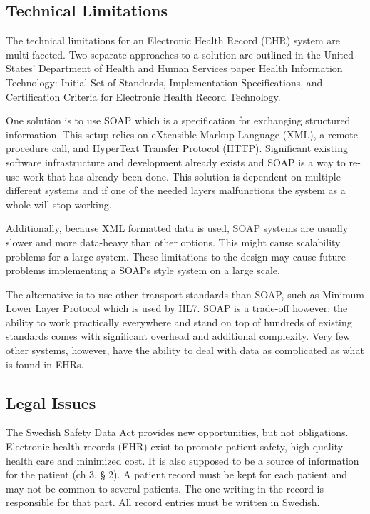 \documentclass[14pt]{article}
\begin{document}
\subsection{Technical Limitations}
\label{sec:futureTechnical}
The technical limitations for an Electronic Health Record (EHR) system are multi-faceted. Two separate approaches to a solution are outlined in the United States’ Department of Health and Human Services paper Health Information Technology: Initial Set of Standards, Implementation Specifications, and Certification Criteria for Electronic Health Record Technology. \cite{AMA} 

One solution is to use \gls{SOAP} which is a specification for exchanging structured information. This setup relies on eXtensible Markup Language (XML), a remote procedure call, and HyperText Transfer Protocol (HTTP). Significant existing software infrastructure and development already exists and SOAP is a way to re-use work that has already been done. This solution is dependent on multiple different systems and if one of the needed layers malfunctions the system as a whole will stop working. 

Additionally, because XML formatted data is used, SOAP systems are usually slower and more data-heavy than other options. This might cause scalability problems for a large system. These limitations to the design may cause future problems implementing a \glspl{SOAP} style system on a large scale.

The alternative is to use other transport standards than SOAP, such as Minimum Lower Layer Protocol which is used by HL7. SOAP is a trade-off however: the ability to work practically everywhere and stand on top of hundreds of existing standards comes with significant overhead and additional complexity. Very few other systems, however, have the ability to deal with data as complicated as what is found in EHRs.

\subsection{Legal Issues}
\label{sec:futureLegal}
The Swedish Safety Data Act provides new opportunities, but not obligations. \cite{RiR19} Electronic health records (EHR) exist to promote patient safety, high quality health care and minimized cost. It is also supposed to be a source of information for the patient (ch 3, § 2). A patient record must be kept for each patient and may not be common to several patients. The one writing in the record is responsible for that part. All record entries must be written in Swedish. \cite{PatientDataAct}
\end{document}
